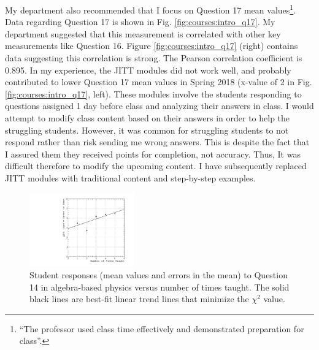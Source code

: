\documentclass[../../main.tex]{subfiles}
\begin{document}
My department also recommended that I focus on Question 17 mean values\footnote{``The professor used class time effectively and demonstrated preparation for class''.}.  Data regarding Question 17 is shown in Fig. \ref{fig:courses:intro_q17}.  My department suggested that this measurement is correlated with other key measurements like Question 16.  Figure \ref{fig:courses:intro_q17} (right) contains data suggesting this correlation is strong.  The Pearson correlation coefficient is 0.895.  In my experience, the JITT modules did not work well, and probably contributed to lower Question 17 mean values in Spring 2018 (x-value of 2 in Fig. \ref{fig:courses:intro_q17}, left).  These modules involve the students responding to questions assigned 1 day before class and analyzing their answers in class.  I would attempt to modify class content based on their answers in order to help the struggling students.  However, it was common for struggling students to not respond rather than risk sending me wrong answers.  This is despite the fact that I assured them they received points for completion, not accuracy.  Thus, It was difficult therefore to modify the upcoming content.  I have subsequently replaced JITT modules with traditional content and step-by-step examples.  \\ \hspace{0.1cm}

\begin{figure}
\centering
\includegraphics[width=0.4\textwidth]{Q14_algebra_based.pdf}
\caption{\label{fig:courses:intro_q14}  Student responses (mean values and errors in the mean) to Question 14 in algebra-based physics versus number of times taught.  The solid black lines are best-fit linear trend lines that minimize the $\chi^2$ value.}
\end{figure}
\end{document}
